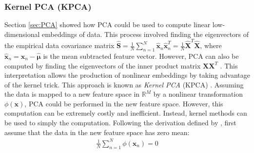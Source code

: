 \subsubsection{Kernel PCA (KPCA)} \label{sec:KPCA}
Section \ref{sec:PCA} showed how PCA could be used to compute linear low-dimensional embeddings of data.  This process involved finding the eigenvectors of the empirical data covariance matrix $\hat{\bm{S}} = \frac{1}{N}\sum_{n=1}^{N}\hat{\bm{x}}_{n}\hat{\bm{x}}_{n}^{T} = \frac{1}{N}\hat{\bm{X}}^{T}\hat{\bm{X}}$, where $\hat{\bm{x}}_{n} = \bm{x}_{n} - \hat{\bm{\mu}}$ is the mean subtracted feature vector.  However, PCA can also be computed by finding the eigenvectors of the inner product matrix $\bm{X}\bm{X}^{T}$ \citep{Murphy2012,Wang2014KPCAReview}.  This interpretation allows the production of nonlinear embeddings by taking advantage of the kernel trick.  This approach is known as \textit{Kernel PCA} (KPCA) \citep{Scholkopf1999KPCA}.  Assuming the data is mapped to a new feature space in $\mathbb{R}^{M}$ by a nonlinear transformation $\phi(\bm{x})$, PCA could be performed in the new feature space.  However, this computation can be extremely costly and inefficient.  Instead, kernel methods can be used to simply the computation.  Following the derivation defined by \cite{Wang2014KPCAReview}, first assume that the data in the new feature space has zero mean:
\begin{align}
	\frac{1}{N} \sum_{n=1}^{N}\phi(\bm{x}_{n}) = 0	
\end{align}

